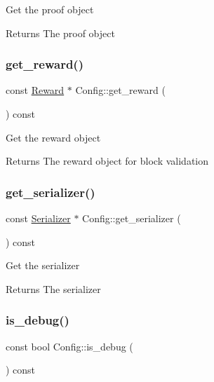 Get the proof object

\begin{DoxyReturn}{Returns}
The proof object 
\end{DoxyReturn}
\mbox{\label{classConfig_a3467e8914f0a0730277cf4732443116d}} 
\subsubsection{\texorpdfstring{get\+\_\+reward()}{get\_reward()}}
{\footnotesize\ttfamily const \mbox{\hyperlink{classReward}{Reward}} $\ast$ Config\+::get\+\_\+reward (\begin{DoxyParamCaption}{ }\end{DoxyParamCaption}) const\hspace{0.3cm}{\ttfamily [virtual]}}

Get the reward object

\begin{DoxyReturn}{Returns}
The reward object for block validation 
\end{DoxyReturn}
\mbox{\label{classConfig_a00399f1751e2dfa032d99208bf925ab0}} 
\subsubsection{\texorpdfstring{get\+\_\+serializer()}{get\_serializer()}}
{\footnotesize\ttfamily const \mbox{\hyperlink{classSerializer}{Serializer}} $\ast$ Config\+::get\+\_\+serializer (\begin{DoxyParamCaption}{ }\end{DoxyParamCaption}) const\hspace{0.3cm}{\ttfamily [virtual]}}

Get the serializer

\begin{DoxyReturn}{Returns}
The serializer 
\end{DoxyReturn}
\mbox{\label{classConfig_afc60cc21dfa15f3642f8ac1f45403450}} 
\subsubsection{\texorpdfstring{is\+\_\+debug()}{is\_debug()}}
{\footnotesize\ttfamily const bool Config\+::is\+\_\+debug (\begin{DoxyParamCaption}{ }\end{DoxyParamCaption}) const\hspace{0.3cm}{\ttfamily [virtual]}}

